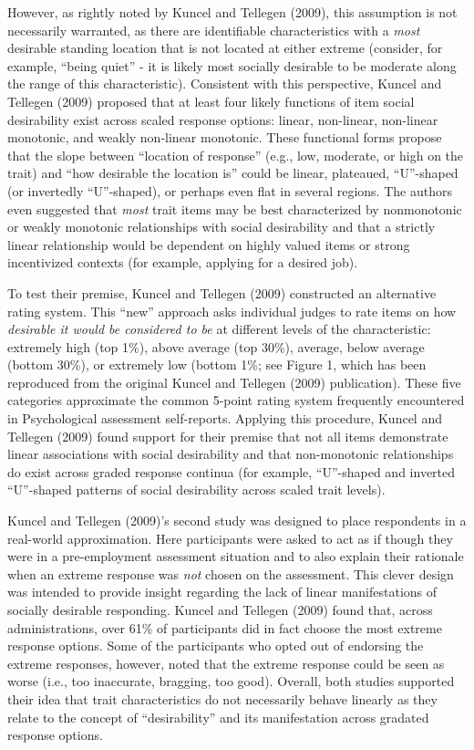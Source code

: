 \documentclass[
  english,
  ,jou]{apa6}
\begin{document}
However, as rightly noted by Kuncel and Tellegen (2009), this assumption is not necessarily warranted, as there are identifiable characteristics with a \emph{most} desirable standing location that is not located at either extreme (consider, for example, \enquote{being quiet} - it is likely most socially desirable to be moderate along the range of this characteristic). Consistent with this perspective, Kuncel and Tellegen (2009) proposed that at least four likely functions of item social desirability exist across scaled response options: linear, non-linear, non-linear monotonic, and weakly non-linear monotonic. These functional forms propose that the slope between \enquote{location of response} (e.g., low, moderate, or high on the trait) and \enquote{how desirable the location is} could be linear, plateaued, \enquote{U}-shaped (or invertedly \enquote{U}-shaped), or perhaps even flat in several regions. The authors even suggested that \emph{most} trait items may be best characterized by nonmonotonic or weakly monotonic relationships with social desirability and that a strictly linear relationship would be dependent on highly valued items or strong incentivized contexts (for example, applying for a desired job).

To test their premise, Kuncel and Tellegen (2009) constructed an alternative rating system. This \enquote{new} approach asks individual judges to rate items on how \emph{desirable it would be considered to be} at different levels of the characteristic: extremely high (top 1\%), above average (top 30\%), average, below average (bottom 30\%), or extremely low (bottom 1\%; see Figure 1, which has been reproduced from the original Kuncel and Tellegen (2009) publication). These five categories approximate the common 5-point rating system frequently encountered in Psychological assessment self-reports. Applying this procedure, Kuncel and Tellegen (2009) found support for their premise that not all items demonstrate linear associations with social desirability and that non-monotonic relationships do exist across graded response continua (for example, \enquote{U}-shaped and inverted \enquote{U}-shaped patterns of social desirability across scaled trait levels).

Kuncel and Tellegen (2009)'s second study was designed to place respondents in a real-world approximation. Here participants were asked to act as if though they were in a pre-employment assessment situation and to also explain their rationale when an extreme response was \emph{not} chosen on the assessment. This clever design was intended to provide insight regarding the lack of linear manifestations of socially desirable responding. Kuncel and Tellegen (2009) found that, across administrations, over 61\% of participants did in fact choose the most extreme response options. Some of the participants who opted out of endorsing the extreme responses, however, noted that the extreme response could be seen as worse (i.e., too inaccurate, bragging, too good). Overall, both studies supported their idea that trait characteristics do not necessarily behave linearly as they relate to the concept of \enquote{desirability} and its manifestation across gradated response options.
\end{document}
